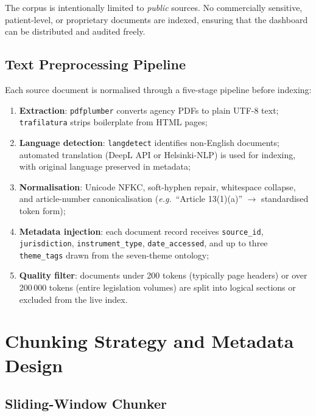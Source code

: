 The corpus is intentionally limited to \emph{public} sources. No commercially
sensitive, patient-level, or proprietary documents are indexed, ensuring that the
dashboard can be distributed and audited freely.

\subsection{Text Preprocessing Pipeline}
\label{sec:rag-preprocessing}

Each source document is normalised through a five-stage pipeline before indexing:

\begin{enumerate}[noitemsep]
  \item \textbf{Extraction}: \texttt{pdfplumber} converts agency PDFs to plain
        UTF-8 text; \texttt{trafilatura} strips boilerplate from HTML pages;
  \item \textbf{Language detection}: \texttt{langdetect} identifies non-English
        documents; automated translation (DeepL API or Helsinki-NLP) is used for
        indexing, with original language preserved in metadata;
  \item \textbf{Normalisation}: Unicode NFKC, soft-hyphen repair, whitespace
        collapse, and article-number canonicalisation
        (\textit{e.g.}\ ``Article 13(1)(a)'' $\to$ standardised token form);
  \item \textbf{Metadata injection}: each document record receives
        \texttt{source\_id}, \texttt{jurisdiction}, \texttt{instrument\_type},
        \texttt{date\_accessed}, and up to three \texttt{theme\_tags} drawn from
        the seven-theme ontology;
  \item \textbf{Quality filter}: documents under 200 tokens (typically page
        headers) or over 200\,000 tokens (entire legislation volumes) are split
        into logical sections or excluded from the live index.
\end{enumerate}

\section{Chunking Strategy and Metadata Design}
\label{sec:rag-chunk-full}

\subsection{Sliding-Window Chunker}
\label{sec:rag-chunk-algo}

